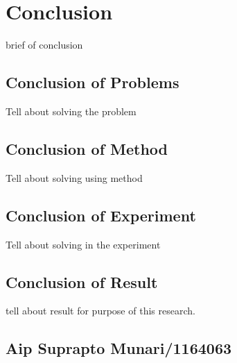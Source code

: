\chapter{Conclusion}
brief of conclusion

\section{Conclusion of Problems}
Tell about solving the problem

\section{Conclusion of Method}
Tell about solving using method

\section{Conclusion of Experiment}
Tell about solving in the experiment

\section{Conclusion of Result}
tell about result for purpose of this research.

\section{Aip Suprapto Munari/1164063}
